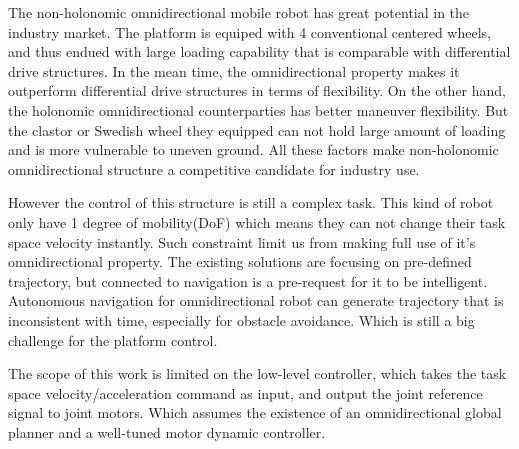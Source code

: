 
The non-holonomic omnidirectional mobile robot has great potential in the industry market. The platform is equiped with 4 conventional centered wheels, and thus endued with large loading capability that is comparable with differential drive structures. In the mean time, the omnidirectional property makes it outperform differential drive structures in terms of flexibility. On the other hand, the holonomic omnidirectional counterparties has better maneuver flexibility. But the clastor or Swedish wheel they equipped can not hold large amount of loading and is more vulnerable to uneven ground. All these factors make non-holonomic omnidirectional structure a competitive candidate for industry use. 


However the control of this structure is still a complex task. This kind of robot only have 1 degree of mobility(DoF) which means they can not change their task space velocity instantly. Such constraint limit us from making full use of it's omnidirectional property. The existing solutions are focusing on pre-defined trajectory, but connected to navigation is a pre-request for it to be intelligent. Autonomous navigation for omnidirectional robot can generate trajectory that is inconsistent with time, especially for obstacle avoidance. Which is still a big challenge for the platform control.

The scope of this work is limited on the low-level controller, which takes the task space velocity/acceleration command as input, and output the joint reference signal to joint motors. Which assumes the existence of an omnidirectional global planner and a well-tuned motor dynamic controller.
